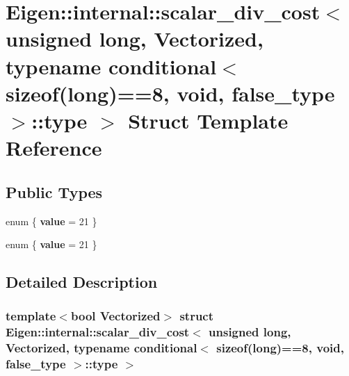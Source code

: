 \hypertarget{struct_eigen_1_1internal_1_1scalar__div__cost_3_01unsigned_01long_00_01_vectorized_00_01typenamea197e29684b99203d4e90be10117c3ad}{}\section{Eigen\+:\+:internal\+:\+:scalar\+\_\+div\+\_\+cost$<$ unsigned long, Vectorized, typename conditional$<$ sizeof(long)==8, void, false\+\_\+type $>$\+:\+:type $>$ Struct Template Reference}
\label{struct_eigen_1_1internal_1_1scalar__div__cost_3_01unsigned_01long_00_01_vectorized_00_01typenamea197e29684b99203d4e90be10117c3ad}
\subsection*{Public Types}
\begin{DoxyCompactItemize}
\item 
\mbox{\label{struct_eigen_1_1internal_1_1scalar__div__cost_3_01unsigned_01long_00_01_vectorized_00_01typenamea197e29684b99203d4e90be10117c3ad_a2d29a5f19fa36c91fc1d8540d0ea37e1}} 
enum \{ {\bfseries value} = 21
 \}
\item 
\mbox{\label{struct_eigen_1_1internal_1_1scalar__div__cost_3_01unsigned_01long_00_01_vectorized_00_01typenamea197e29684b99203d4e90be10117c3ad_adbff745df9cfdcca43763fd5736b3736}} 
enum \{ {\bfseries value} = 21
 \}
\end{DoxyCompactItemize}


\subsection{Detailed Description}
\subsubsection*{template$<$bool Vectorized$>$\newline
struct Eigen\+::internal\+::scalar\+\_\+div\+\_\+cost$<$ unsigned long, Vectorized, typename conditional$<$ sizeof(long)==8, void, false\+\_\+type $>$\+::type $>$}



